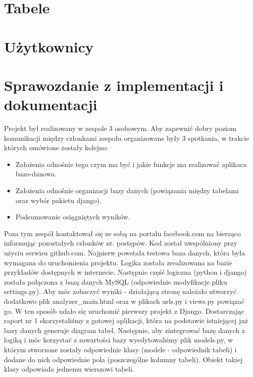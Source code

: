 \documentclass[a4paper]{article}
\begin{document}
\section{Tabele}


\section{Użytkownicy}


\section{Sprawozdanie z implementacji i dokumentacji}
Projekt był realizowany w zespole 3 osobowym. Aby zapewnić dobry poziom komunikacji między członkami zespołu organizowane były 3 spotkania, w trakcie których omówione zostały kolejno:
\begin{itemize}
	\item Założenia odnośnie tego czym ma być i jakie funkcje ma realizować aplikaca bazo-danowa.
	\item Założenia odnośnie organizacji bazy danych (powiązania między tabelami oraz wybór pakietu django).
	\item Podsumowanie osiągniętych wyników.
\end{itemize}
Poza tym zespół kontaktował się ze sobą na portalu facebook.com na bierząco informując pozostałych członków nt. postępów. Kod został uwspólniony przy użyciu serwisu github.com. 
\newline
Najpierw powstała testowa baza danych, która była wymagana do uruchomienia projektu. Logika została zrealizowana na bazie przykładów dostępnych w internecie. Następnie część logiczna (python i django) została połączona z bazą danych MySQL (odpowiednie modyfikacje pliku settings.py). Aby móc zobaczyć wyniki - działającą stronę należało utworzyć dodatkowo plik analyzer\_main.html oraz w plikach urls.py i views.py powiązać go. W ten sposób udało się uruchomić pierwszy projekt z Django.
\newline
Dostarczając raport nr 1 skorzystaliśmy z gotowej aplikacji, która na podstawie istniejącej już bazy danych generuje diagram tabel. 
Następnie, aby zintegrować bazę danych z logiką i móc korzystać z zawartości bazy wyedytowaliśmy plik models.py, w którym stworzone zostały odpowiednie klasy (modele - odpowiednik tabeli) i dodane do nich odpowiednie pola (poszczególne kolumny tabeli). Obiekt takiej klasy odpowiada jednemu wierszowi tabeli. 
\newline
\end{document}
